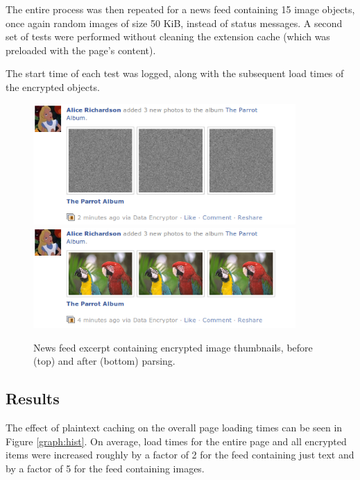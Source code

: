 The entire process was then repeated for a news feed containing 15 image objects, once again random images of size 50 KiB, instead of status messages. A second set of tests were performed without cleaning the extension cache (which was preloaded with the page's content).

The start time of each test was logged, along with the subsequent load times of the encrypted objects. 

    \begin{figure}[tbph]
        \begin{center}
                \includegraphics[width=10cm]{screens/parrots1.png}
                \includegraphics[width=10cm]{screens/parrots2.png}
            \caption{News feed excerpt containing encrypted image thumbnails, before (top) and after (bottom) parsing.}
            \label{scn:parrots}
        \end{center}
    \end{figure}


\subsection{Results}

The effect of plaintext caching on the overall page loading times can be seen in Figure \ref{graph:hist}. On average, load times for the entire page and all encrypted items were increased roughly by a factor of 2 for the feed containing just text and by a factor of 5 for the feed containing images. 

